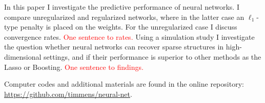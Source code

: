 In this paper I investigate the predictive performance of neural networks. I compare
unregularized and regularized networks, where in the latter case an $\ell_1$-type
penalty is placed on the weights. For the unregularized case I discuss convergence
rates.
\textcolor{red}{One sentence to rates.}
Using a simulation study I investigate the question whether neural networks can
recover sparse structures in high-dimensional settings, and if their performance is
superior to other methods as the Lasso or Boosting.
\textcolor{red}{One sentence to findings.}

Computer codes and additional materials are found in the online repository:
\url{https://github.com/timmens/neural-net}.
